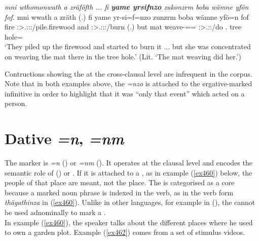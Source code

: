 \begin{exe}
	\ex \emph{mni wthomonwath a zräföfth ... fi \textbf{yame yrsifnzo} zukonzrm boba wämne yfön fof.}
	\gll mni wwath a zräth (.) fi yame yr-si=f=nzo zunzrm boba wämne yfö=n fof\\
	fire \Stpl:\Sbj>\Tsg.\F:\Obj:\Pst:\Ipfv/pile.firewood and \Stpl:\Sbj>\Tsg.\F:\Obj:\Irr:\Pfv/burn (.) but mat weave-\Nmlz=\Erg=\Only{} \Stsg:\Sbj>\Tsg.\F:\Pst:\Dur/do \Med.\Abl{} tree hole=\Loc{} \Emph{}\\
	\trans `They piled up the firewood and started to burn it ... but she was concentrated on weaving the mat there in the tree hole.' (Lit. `The mat weaving did her.')
	\label{ex470}
\end{exe}

Contructions showing the  at the cross-clausal level are infrequent in the corpus. Note that in both examples above, the   \emph{=nzo} is attached to the ergative-marked infinitive in order to highlight that it was ``only that event'' which acted on a person.

\section{Dative \emph{=n}, \emph{=nm}} \label{datcase}

The   marker is \emph{=n} (\Sg) or \emph{=nm} (\Nsg). It operates at the clausal level and encodes the semantic role of ()  or . If it is attached to a , as in example (\ref{ex460}) below, the people of that place are meant, not the place. The  is categorised as a core  because a  marked noun phrase is indexed in the verb, as in the verb form \emph{thägathinza} in (\ref{ex460}). Unlike in other  languages, for example in  (\citealt{Carroll:Ngkolmpu}), the   cannot be used adnominally to mark a .\\
 
In example (\ref{ex460}), the speaker talks about the different places where he used to own a garden plot. Example (\ref{ex462}) comes from a set of stimulus videos.


